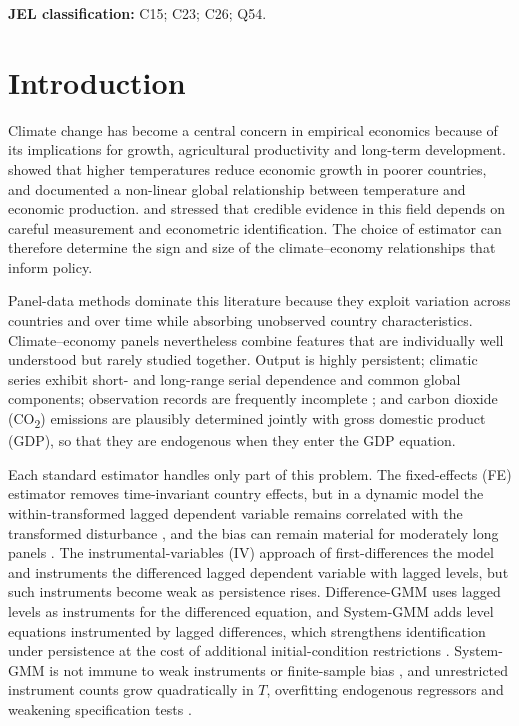 \documentclass[11pt,a4paper]{article}
\newcommand{\COtwo}{CO\textsubscript{2}}
\begin{document}
\noindent\textbf{JEL classification:} C15; C23; C26; Q54.

\section{Introduction}

Climate change has become a central concern in empirical economics because of its implications for growth, agricultural productivity and long-term development. \citet{Dell2012} showed that higher temperatures reduce economic growth in poorer countries, and \citet{Burke2015} documented a non-linear global relationship between temperature and economic production. \citet{Auffhammer2013} and \citet{Hsiang2016} stressed that credible evidence in this field depends on careful measurement and econometric identification. The choice of estimator can therefore determine the sign and size of the climate--economy relationships that inform policy.

Panel-data methods dominate this literature because they exploit variation across countries and over time while absorbing unobserved country characteristics. Climate--economy panels nevertheless combine features that are individually well understood but rarely studied together. Output is highly persistent; climatic series exhibit short- and long-range serial dependence \citep{Gao2024} and common global components; observation records are frequently incomplete \citep{Atak2011}; and carbon dioxide (\COtwo) emissions are plausibly determined jointly with gross domestic product (GDP), so that they are endogenous when they enter the GDP equation.

Each standard estimator handles only part of this problem. The fixed-effects (FE) estimator removes time-invariant country effects, but in a dynamic model the within-transformed lagged dependent variable remains correlated with the transformed disturbance \citep{Nickell1981}, and the bias can remain material for moderately long panels \citep{Judson1999}. The instrumental-variables (IV) approach of \citet{Anderson1981,Anderson1982} first-differences the model and instruments the differenced lagged dependent variable with lagged levels, but such instruments become weak as persistence rises. Difference-GMM \citep{Arellano1991} uses lagged levels as instruments for the differenced equation, and System-GMM \citep{Arellano1995,Blundell1998} adds level equations instrumented by lagged differences, which strengthens identification under persistence at the cost of additional initial-condition restrictions \citep{Ullah2018}. System-GMM is not immune to weak instruments \citep{Bun2010} or finite-sample bias \citep{Hayakawa2007}, and unrestricted instrument counts grow quadratically in $T$, overfitting endogenous regressors and weakening specification tests \citep{Roodman2009a,Roodman2009b}.
\end{document}
